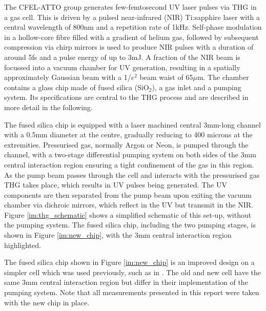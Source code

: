 \documentclass[a4paper]{jpconf}
\begin{document}
The CFEL-ATTO group generates few-femtosecond UV laser pulses via THG in a gas cell. This is driven by a pulsed near-infrared (NIR) Ti:sapphire laser with a central wavelength of 800nm and a repetition rate of 1kHz. Self-phase modulation in a hollow-core fibre filled with a gradient of helium gas, followed by subsequent compression via chirp mirrors is used to produce NIR pulses with a duration of around 5fs and a pulse energy of up to 3mJ. A fraction of the NIR beam is focussed into a vacuum chamber for UV generation, resulting in a spatially approximately Gaussian beam with a 1/$e^2$ beam waist of 65$\mu$m. The chamber contains a glass chip made of fused silica (SiO$_2$), a gas inlet and a pumping system. Its specifications are central to the THG process and are described in more detail in the following. \par 
The fused silica chip is equipped with a laser machined central 3mm-long channel with a 0.5mm diameter at the centre, gradually reducing to 400 microns at the extremities. Pressurised gas, normally Argon or Neon, is pumped through the channel, with a two-stage differential pumping system on both sides of the 3mm central interaction region ensuring a tight confinement of the gas in this region. As the pump beam passes through the cell and interacts with the pressurised gas THG takes place, which results in UV pulses being generated. The UV components are then separated from the pump beam upon exiting the vacuum chamber via dichroic mirrors, which reflect in the UV but transmit in the NIR. Figure \ref{im:thg_schematic} shows a simplified schematic of this set-up, without the pumping system. The fused silica chip, including the two pumping stages, is shown in Figure \ref{im:new_chip}, with the 3mm central interaction region highlighted. \par 
The fused silica chip shown in Figure \ref{im:new_chip} is an improved design on a simpler  cell which was used previously, such as in \cite{galli2019}. The old and new cell have the same 3mm central interaction region but differ in their implementation of the pumping system.   Note that all measurements presented in this report were taken with the new chip in place. 
\end{document}
